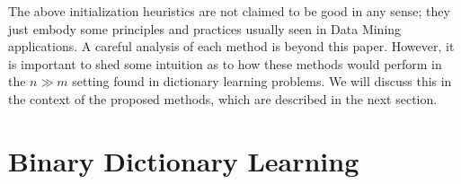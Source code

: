 \documentclass[a4paper]{IEEEtran}
\begin{document}
The above initialization heuristics are not claimed to be good in any sense; they just embody some principles and practices usually seen in Data Mining applications. A careful analysis of each method is beyond this paper. However, it is important to shed some intuition as to how these methods would perform in the $n \gg m$ setting found in dictionary learning problems. We will discuss this in the context of the proposed methods, which are described in the next section.


\section{Binary Dictionary Learning}
\end{document}
